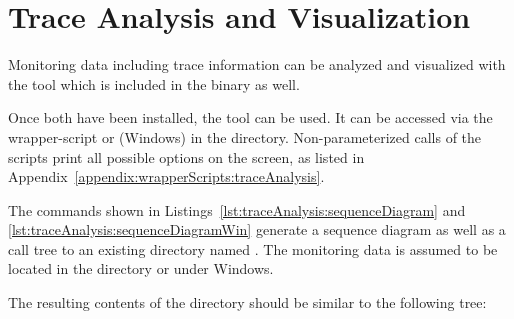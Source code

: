 \section{Trace Analysis and Visualization}\label{sec:traceAnalysisTool}

Monitoring data including trace information can be analyzed and visualized with %
the \KiekerTraceAnalysis{} tool which is included in the \Kieker{} binary as well.\\

 \vspace{3mm}

\noindent Once both have been installed, the \KiekerTraceAnalysis{} tool can be %
used. It can be accessed via the wrapper-script  or %
 (Windows) in the  directory. %
Non-parameterized calls of the scripts print all possible options on the screen, %
as listed in Appendix~\ref{appendix:wrapperScripts:traceAnalysis}.

The commands shown in Listings~\ref{lst:traceAnalysis:sequenceDiagram} and \ref{lst:traceAnalysis:sequenceDiagramWin} generate a sequence diagram as well %
as a call tree to an existing directory named . The monitoring data %
is assumed to be located in the directory %
 or  under Windows. %

\setBashListing



The resulting contents of the  directory should be similar to %
the following tree: 

\begin{figure}[H]
\begin{graybox}
\end{graybox}
\end{figure}

